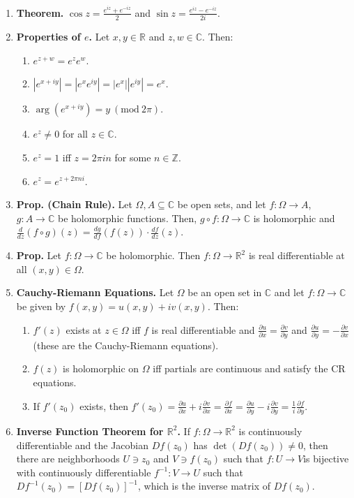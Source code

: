\documentclass[12pt]{article}
\theoremstyle{definition}
\theoremstyle{named}
\newcommand{\Mod}[1]{\ (\mathrm{mod}\ #1)}
\begin{document}
{\begin{multicols}{2}
\begin{spacing}{1.01}
\begin{enumerate}
    \item \textbf{Theorem. } $\cos z = \frac{e^{iz} + e^{-iz}}{2}$ and $\sin z = \frac{e^{iz} - e^{-iz}}{2i}$. 
    \item \textbf{Properties of $e$. } Let $x,y \in \mathbb{R}$ and $z,w \in \mathbb{C}$. Then: 
    \begin{enumerate}
        \item $e^{z + w} = e^ze^w$. 
        \item $|e^{x + iy}| = |e^xe^{iy}| = |e^x||e^{iy}| = e^x$. 
        \item $\arg(e^{x + iy}) = y \Mod{2\pi}$. 
        \item $e^z \neq 0$ for all $z \in \mathbb{C}$. 
        \item $e^z = 1$ iff $z = 2\pi in$ for some $n \in \mathbb{Z}$. 
        \item $e^z = e^{z + 2\pi ni}$. 
    \end{enumerate} 
    \item \textbf{Prop. (Chain Rule). } Let $\Omega, A \subseteq \mathbb{C}$ be open sets, and let $f: \Omega \to A$, $g: A \to \mathbb{C}$ be holomorphic functions. Then, $g \circ f: \Omega \to \mathbb{C}$ is holomorphic and $\frac{d}{dz}(f \circ g)(z) = \frac{dg}{df}(f(z)) \cdot \frac{df}{dz}(z)$. 
    \item \textbf{Prop. } Let $f: \Omega \to \mathbb{C}$ be holomorphic. Then $f: \Omega \to \mathbb{R}^2$ is real differentiable at all $(x,y) \in \Omega$. 
    \item \textbf{Cauchy-Riemann Equations. } Let $\Omega$ be an open set in $\mathbb{C}$ and let $f: \Omega \to \mathbb{C}$ be given by $f(x,y) = u(x,y) + iv(x,y)$. Then: 
    \begin{enumerate}
        \item $f'(z)$ exists at $z \in \Omega$ iff $f$ is real differentiable and $\frac{\partial u}{\partial x} = \frac{\partial v}{\partial y}$ and $\frac{\partial u}{\partial y} = -\frac{\partial v}{\partial x}$ (these are the Cauchy-Riemann equations). 
        \item $f(z)$ is holomorphic on $\Omega$ iff partials are continuous and satisfy the CR equations. 
        \item If $f'(z_0)$ exists, then $f'(z_0) = \frac{\partial u}{\partial x} + i\frac{\partial v}{\partial x} = \frac{\partial f}{\partial x} = \frac{\partial u}{\partial y} - i\frac{\partial v}{\partial y} = \frac{1}{i}\frac{\partial f}{\partial y}$. 
    \end{enumerate}
    \item \textbf{Inverse Function Theorem for $\mathbb{R}^2$. } If $f: \Omega \to \mathbb{R}^2$ is continuously differentiable and the Jacobian $Df(z_0)$ has $\det(Df(z_0)) \neq 0$, then there are neighborhoods $U \ni z_0$ and $V \ni f(z_0)$ such that $f: U \to V$is bijective with continuously differentiable $f^{-1}: V \to U$ such that $Df^{-1}(z_0) = [Df(z_0)]^{-1}$, which is the inverse matrix of $Df(z_0)$. 

\end{enumerate}
\end{spacing}
\end{multicols}}
\end{document}
